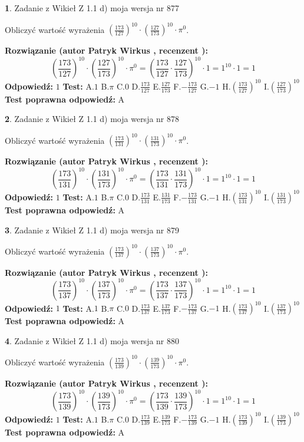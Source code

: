 \documentclass[12pt, a4paper]{article}
\theoremstyle{definition} %
\newtheorem{zad}{}
\newcommand{\zadStart}[1]{\begin{zad}#1\newline}
\newcommand{\zadStop}{\end{zad}}
\newcommand{\rozwStart}[2]{\noindent \textbf{Rozwiązanie (autor #1 , recenzent #2): }\newline}
\newcommand{\rozwStop}{\newline}
\newcommand{\odpStart}{\noindent \textbf{Odpowiedź:}\newline}
\newcommand{\odpStop}{\newline}
\newcommand{\testStart}{\noindent \textbf{Test:}\newline}
\newcommand{\testStop}{\newline}
\newcommand{\kluczStart}{\noindent \textbf{Test poprawna odpowiedź:}\newline}
\newcommand{\kluczStop}{\newline}
\begin{document}
\zadStart{Zadanie z Wikieł Z 1.1 d) moja wersja nr 877}

Obliczyć wartość wyrażenia $(\frac{173}{127})^{10} \cdot (\frac{127}{173})^{10} \cdot \pi^{0}$.
\zadStop
\rozwStart{Patryk Wirkus}{}
$$(\frac{173}{127})^{10} \cdot (\frac{127}{173})^{10} \cdot \pi^{0} = (\frac{173}{127} \cdot \frac{127}{173})^{10} \cdot 1 = 1^{10} \cdot 1 = 1$$
\rozwStop
\odpStart
$1$
\odpStop
\testStart
A.$1$ B.$\pi$ C.$0$ D.$\frac{173}{127}$ E.$\frac{127}{173}$
F.$-\frac{173}{127}$ G.$-1$
H.$(\frac{173}{127})^{10}$
I.$(\frac{127}{173})^{10}$
\testStop
\kluczStart
A
\kluczStop



\zadStart{Zadanie z Wikieł Z 1.1 d) moja wersja nr 878}

Obliczyć wartość wyrażenia $(\frac{173}{131})^{10} \cdot (\frac{131}{173})^{10} \cdot \pi^{0}$.
\zadStop
\rozwStart{Patryk Wirkus}{}
$$(\frac{173}{131})^{10} \cdot (\frac{131}{173})^{10} \cdot \pi^{0} = (\frac{173}{131} \cdot \frac{131}{173})^{10} \cdot 1 = 1^{10} \cdot 1 = 1$$
\rozwStop
\odpStart
$1$
\odpStop
\testStart
A.$1$ B.$\pi$ C.$0$ D.$\frac{173}{131}$ E.$\frac{131}{173}$
F.$-\frac{173}{131}$ G.$-1$
H.$(\frac{173}{131})^{10}$
I.$(\frac{131}{173})^{10}$
\testStop
\kluczStart
A
\kluczStop



\zadStart{Zadanie z Wikieł Z 1.1 d) moja wersja nr 879}

Obliczyć wartość wyrażenia $(\frac{173}{137})^{10} \cdot (\frac{137}{173})^{10} \cdot \pi^{0}$.
\zadStop
\rozwStart{Patryk Wirkus}{}
$$(\frac{173}{137})^{10} \cdot (\frac{137}{173})^{10} \cdot \pi^{0} = (\frac{173}{137} \cdot \frac{137}{173})^{10} \cdot 1 = 1^{10} \cdot 1 = 1$$
\rozwStop
\odpStart
$1$
\odpStop
\testStart
A.$1$ B.$\pi$ C.$0$ D.$\frac{173}{137}$ E.$\frac{137}{173}$
F.$-\frac{173}{137}$ G.$-1$
H.$(\frac{173}{137})^{10}$
I.$(\frac{137}{173})^{10}$
\testStop
\kluczStart
A
\kluczStop



\zadStart{Zadanie z Wikieł Z 1.1 d) moja wersja nr 880}

Obliczyć wartość wyrażenia $(\frac{173}{139})^{10} \cdot (\frac{139}{173})^{10} \cdot \pi^{0}$.
\zadStop
\rozwStart{Patryk Wirkus}{}
$$(\frac{173}{139})^{10} \cdot (\frac{139}{173})^{10} \cdot \pi^{0} = (\frac{173}{139} \cdot \frac{139}{173})^{10} \cdot 1 = 1^{10} \cdot 1 = 1$$
\rozwStop
\odpStart
$1$
\odpStop
\testStart
A.$1$ B.$\pi$ C.$0$ D.$\frac{173}{139}$ E.$\frac{139}{173}$
F.$-\frac{173}{139}$ G.$-1$
H.$(\frac{173}{139})^{10}$
I.$(\frac{139}{173})^{10}$
\testStop
\kluczStart
A
\kluczStop
\end{document}
